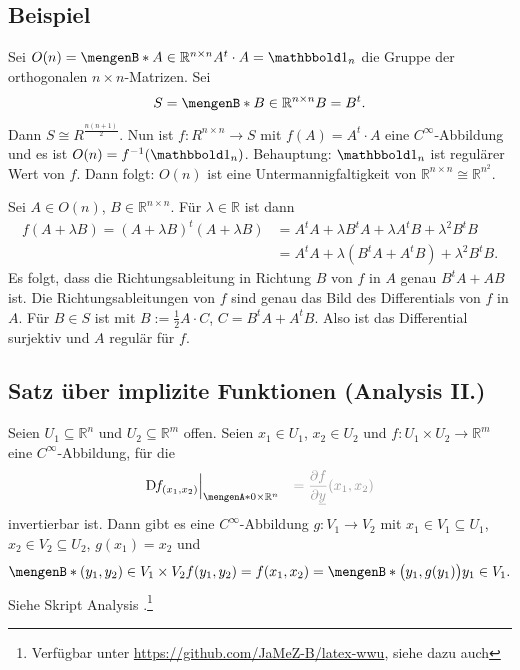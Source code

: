 \subsection[Beispielanwendung von \ref{sub:167} für die orthogonalen Matrizen]{Beispiel} %
\label{sub:168}
Sei $O(n) = \set[A \in \mathds{R}^{n \times n}]{ A^t \cdot A= \ind_n}$ die Gruppe der orthogonalen $n \times n$-Matrizen. Sei 
\[
	S = \set[B \in \mathds{R}^{n \times n}]{B = B^t}. 
\]
Dann $S \cong R^{\frac{n(n+1)}{2}}$. Nun ist $f : R^{n \times n} \to S$ mit $f(A)= A^t \cdot A$ eine 
$C^\infty$-Abbildung und es ist $O(n) = f ^{-1}(\ind_n)$. 
Behauptung: $\ind_n$ ist regulärer Wert von $f$. Dann folgt: $O(n)$ ist eine Untermannigfaltigkeit von $\mathds{R}^{n \times n} \cong \mathds{R}^{n^2}$.

Sei $A \in O(n)$, $B \in \mathds{R}^{n \times n}$. Für $\lambda  \in \mathds{R}$ ist dann 
\begin{align*}
	f(A+ \lambda B) = (A+ \lambda B)^t (A+ \lambda B) &= A^t A + \lambda B^t A + \lambda A^t B + \lambda^2 B^t B \\ &= A^t A + \lambda (B^t A + A^t B) + \lambda^2 B^t B.
\end{align*}
Es folgt, dass die Richtungsableitung in Richtung $B$ von $f$ in $A$ genau $B^t A + AB$ ist. Die Richtungsableitungen von $f$ sind genau das Bild des Differentials von $f$
in $A$. Für $B \in S$ ist mit $B := \frac{1}{2} A \cdot C $, $C = B^t A + A^t B$. Also ist das Differential surjektiv und $A$ regulär für $f$. \bewende

\subsection{Satz über implizite Funktionen (Analysis II.)} %
\label{sub:169}
Seien $U_1 \subseteq \mathds{R}^n$ und $U_2 \subseteq \mathds{R}^m$ offen. Seien $x_1 \in U_1$, $x_2 \in U_2$ und $f : U_1 \times U_2 \to \mathds{R}^m$ eine 
$C^\infty$-Abbildung, für die
\[
	\D f_{(x_1,x_2)} \Big|_{\set{0} \times \mathds{R}^n } \quad {\color{light_gray} = \diff{f}{\underline{y}} (x_1, x_2)}
\]
invertierbar ist. Dann gibt es eine $C^\infty$-Abbildung $g : V_1 \to V_2$ mit $x_1 \in V_1 \subseteq U_1$, $x_2 \in V_2 \subseteq U_2$, $g(x_1)=x_2$ und 
\[
	\set[(y_1, y_2) \in V_1 \times V_2]{f(y_1, y_2)= f(x_1,x_2)\rule{0cm}{1em}} = \set[{\enbrace[\big]{y_1, g(y_1)}}]{y_1 \in V_1 \rule{0cm}{1em}}.  
\]
Siehe Skript  Analysis .\footnote{\label{note5}Verfügbar unter \url{https://github.com/JaMeZ-B/latex-wwu}, siehe dazu auch 
} \bewende

